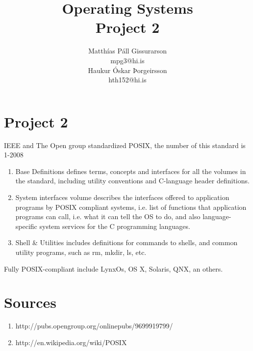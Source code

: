 \documentclass[12pt]{article}
\title{Operating Systems\\
Project 2}
\author{Matthías Páll Gissurarson \\mpg3@hi.is\\
Haukur Óskar Þorgeirsson\\hth152@hi.is}
\begin{document}
\maketitle

\section{Project 2}
IEEE and The Open group standardized POSIX, the number of this standard is 1-2008

\begin{enumerate}
\item{Base Definitions defines terms, concepts and interfaces for all the volumes in the standard, including utility conventions and C-language header definitions.}
\item{System interfaces volume describes the interfaces offered to application programs by POSIX compliant systems, i.e. list of functions that application programs can call, i.e. what it can tell the OS to do, and also language-specific system services for the C programming languages. }
\item{Shell \& Utilities includes definitions for commands to shells, and common utility programs, such as rm, mkdir, ls, etc.}
\end{enumerate}


Fully POSIX-compliant include LynxOs, OS X, Solaris, QNX, an others.

\section{Sources}
\begin{enumerate}
\item{http://pubs.opengroup.org/onlinepubs/9699919799/}
\item{http://en.wikipedia.org/wiki/POSIX}
\end{enumerate}
\end{document}
